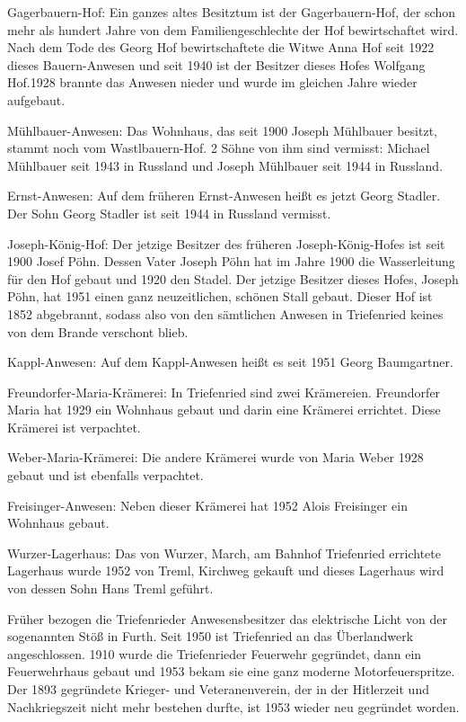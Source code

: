 \documentclass{book}
\begin{document}
Gagerbauern-Hof: Ein ganzes altes Besitztum ist der Gagerbauern-Hof, der schon
mehr als hundert Jahre von dem Familiengeschlechte der Hof bewirtschaftet wird.
Nach dem Tode des Georg Hof bewirtschaftete die Witwe Anna Hof seit 1922 dieses
Bauern-Anwesen und seit 1940 ist der Besitzer dieses Hofes Wolfgang Hof.1928
brannte das Anwesen nieder und wurde im gleichen Jahre wieder aufgebaut.

Mühlbauer-Anwesen: Das Wohnhaus, das seit 1900 Joseph Mühlbauer besitzt, stammt
noch vom Wastlbauern-Hof. 2 Söhne von ihm sind vermisst: Michael Mühlbauer seit
1943 in Russland und Joseph Mühlbauer seit 1944 in Russland.

Ernst-Anwesen: Auf dem früheren Ernst-Anwesen heißt es jetzt Georg Stadler. Der
Sohn Georg Stadler ist seit 1944 in Russland vermisst.

Joseph-König-Hof: Der jetzige Besitzer des früheren Joseph-König-Hofes ist seit
1900 Josef Pöhn. Dessen Vater Joseph Pöhn hat im Jahre 1900 die Wasserleitung
für den Hof gebaut und 1920 den Stadel. Der jetzige Besitzer dieses Hofes,
Joseph Pöhn, hat 1951 einen ganz neuzeitlichen, schönen Stall gebaut. Dieser Hof
ist 1852 abgebrannt, sodass also von den sämtlichen Anwesen in Triefenried
keines von dem Brande verschont blieb.

Kappl-Anwesen: Auf dem Kappl-Anwesen heißt es seit 1951 Georg Baumgartner.

Freundorfer-Maria-Krämerei: In Triefenried sind zwei Krämereien. Freundorfer
Maria hat 1929 ein Wohnhaus gebaut und darin eine Krämerei errichtet. Diese
Krämerei ist verpachtet.

Weber-Maria-Krämerei: Die andere Krämerei wurde von Maria Weber 1928 gebaut und
ist ebenfalls verpachtet.

Freisinger-Anwesen: Neben dieser Krämerei hat 1952 Alois Freisinger ein Wohnhaus
gebaut.

Wurzer-Lagerhaus: Das von Wurzer, March, am Bahnhof Triefenried errichtete
Lagerhaus wurde 1952 von Treml, Kirchweg gekauft und dieses Lagerhaus wird von
dessen Sohn Hans Treml geführt.

Früher bezogen die Triefenrieder Anwesensbesitzer das elektrische Licht von der
sogenannten Stöß in Furth. Seit 1950 ist Triefenried an das Überlandwerk
angeschlossen. 1910 wurde die Triefenrieder Feuerwehr gegründet, dann ein
Feuerwehrhaus gebaut und 1953 bekam sie eine ganz moderne Motorfeuerspritze. Der
1893 gegründete Krieger- und Veteranenverein, der in der Hitlerzeit und
Nachkriegszeit nicht mehr bestehen durfte, ist 1953 wieder neu gegründet worden.
\end{document}
